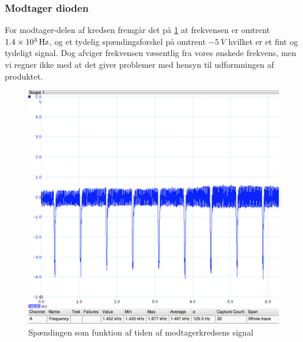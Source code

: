 \subsubsection{Modtager dioden} \label{subs:modtagertest}
For modtager-delen af kredsen fremgår det på \ref{fig:IR_modtagerTest} at frekvensen er omtrent $\SI{1.4d3}{Hz}$, og et tydelig spændingsforskel på omtrent $-\SI{5}{V}$ hvilket er et fint og tydeligt signal. Dog afviger frekvensen væsentlig fra vores ønskede frekvens, men vi regner ikke med at det giver problemer med hensyn til udformningen af produktet.
\begin{figure}[H]
	\centering
    \includegraphics[width=13cm]{figures/2_4_3hastighed/IR_modtager.png}
	\caption{Spændingen som funktion af tiden af modtagerkredsens signal}
	\label{fig:IR_modtagerTest}
\end{figure}

















